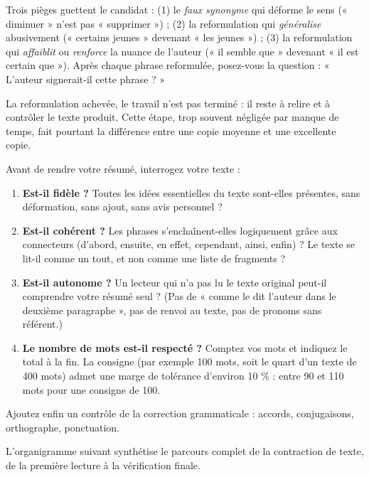 \documentclass[11pt]{article}
\newcounter{popsec}
\newcounter{popsub}
\newcommand{\courssub}[1]{%
  \stepcounter{popsub}%
  \par\vspace{9pt}\noindent{\popxbold\fontsize{11.5}{13}\selectfont\color{popink}{\color{poporange}\thepopsec.\thepopsub}\hspace{6pt}#1}\par\nopagebreak\vspace{4pt}
}
\begin{document}
\begin{attention}
Trois pièges guettent le candidat : (1) le \emph{faux synonyme} qui déforme le sens (« diminuer » n'est pas « supprimer ») ; (2) la reformulation qui \emph{généralise} abusivement (« certains jeunes » devenant « les jeunes ») ; (3) la reformulation qui \emph{affaiblit} ou \emph{renforce} la nuance de l'auteur (« il semble que » devenant « il est certain que »). Après chaque phrase reformulée, posez-vous la question : « L'auteur signerait-il cette phrase ? »
\end{attention}

\courssub{La vérification finale du résumé}

La reformulation achevée, le travail n'est pas terminé : il reste à relire et à contrôler le texte produit. Cette étape, trop souvent négligée par manque de temps, fait pourtant la différence entre une copie moyenne et une excellente copie.

\begin{methode}
Avant de rendre votre résumé, interrogez votre texte :
\begin{enumerate}
\item \textbf{Est-il fidèle ?} Toutes les idées essentielles du texte sont-elles présentes, sans déformation, sans ajout, sans avis personnel ?
\item \textbf{Est-il cohérent ?} Les phrases s'enchaînent-elles logiquement grâce aux connecteurs (d'abord, ensuite, en effet, cependant, ainsi, enfin) ? Le texte se lit-il comme un tout, et non comme une liste de fragments ?
\item \textbf{Est-il autonome ?} Un lecteur qui n'a pas lu le texte original peut-il comprendre votre résumé seul ? (Pas de « comme le dit l'auteur dans le deuxième paragraphe », pas de renvoi au texte, pas de pronoms sans référent.)
\item \textbf{Le nombre de mots est-il respecté ?} Comptez vos mots et indiquez le total à la fin. La consigne (par exemple 100 mots, soit le quart d'un texte de 400 mots) admet une marge de tolérance d'environ 10 \% : entre 90 et 110 mots pour une consigne de 100.
\end{enumerate}
Ajoutez enfin un contrôle de la correction grammaticale : accords, conjugaisons, orthographe, ponctuation.
\end{methode}

L'organigramme suivant synthétise le parcours complet de la contraction de texte, de la première lecture à la vérification finale.
\end{document}
